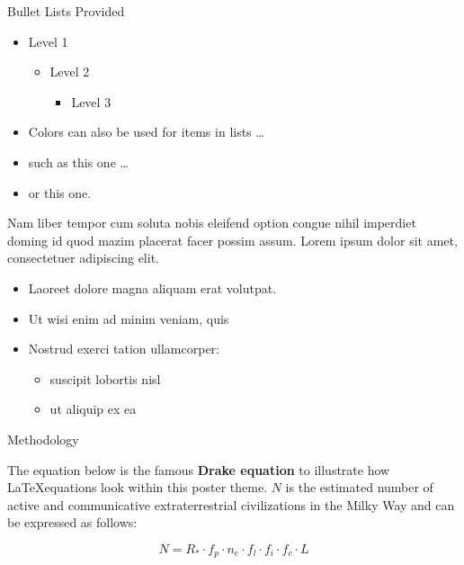 \documentclass[final]{beamer}
\begin{document}
\begin{frame}[fragile]
\begin{columns}[t]
\begin{leftcolumn}
\begin{boxblock}{Bullet Lists Provided}
      \begin{itemize}
         \item Level 1
         \begin{itemize}
            \item Level 2
            \begin{itemize}
               \item Level 3
            \end{itemize}
         \end{itemize}
      \end{itemize}

      \begin{itemize}
         \item Colors can also be used for items in lists \dots
         \color{uibkblue}
         \item such as this one \dots
         \color{uibkorange}
         \item or this one.
      \end{itemize}

      Nam liber tempor cum soluta nobis eleifend option congue nihil imperdiet
      doming id quod mazim placerat facer possim assum. Lorem ipsum dolor sit amet,
      consectetuer adipiscing elit.

      \begin{itemize}
         \item Laoreet dolore magna aliquam erat volutpat.
         \item Ut wisi enim ad minim veniam, quis
         \item Nostrud exerci tation ullamcorper:
         \begin{itemize}
            \item suscipit lobortis nisl
            \item ut aliquip ex ea
         \end{itemize}
      \end{itemize}
   \end{boxblock}

   \begin{boxblock}{Methodology}

      The equation below is the famous {\bf Drake equation} to 
      illustrate how \LaTeX equations look within this poster theme.
      $N$ is the estimated number of active and communicative extraterrestrial
      civilizations in the Milky Way and can be expressed as follows:

      \begin{equation}
         N = R_* \cdot f_p \cdot n_e \cdot f_l \cdot f_i \cdot f_c \cdot L
      \end{equation}


\end{boxblock}
\end{leftcolumn}
\end{columns}
\end{frame}
\end{document}
